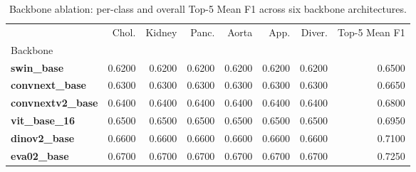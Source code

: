 \begin{table}
\caption{Backbone ablation: per-class and overall Top-5 Mean F1 across six backbone architectures.}
\label{tab:backbone}
\begin{tabular}{lrrrrrrr}
\toprule
 & Chol. & Kidney & Panc. & Aorta & App. & Diver. & Top-5 Mean F1 \\
Backbone &  &  &  &  &  &  &  \\
\midrule
\textbf{swin_base} & 0.6200 & 0.6200 & 0.6200 & 0.6200 & 0.6200 & 0.6200 & 0.6500 \\
\textbf{convnext_base} & 0.6300 & 0.6300 & 0.6300 & 0.6300 & 0.6300 & 0.6300 & 0.6650 \\
\textbf{convnextv2_base} & 0.6400 & 0.6400 & 0.6400 & 0.6400 & 0.6400 & 0.6400 & 0.6800 \\
\textbf{vit_base_16} & 0.6500 & 0.6500 & 0.6500 & 0.6500 & 0.6500 & 0.6500 & 0.6950 \\
\textbf{dinov2_base} & 0.6600 & 0.6600 & 0.6600 & 0.6600 & 0.6600 & 0.6600 & 0.7100 \\
\textbf{eva02_base} & 0.6700 & 0.6700 & 0.6700 & 0.6700 & 0.6700 & 0.6700 & 0.7250 \\
\bottomrule
\end{tabular}
\end{table}
